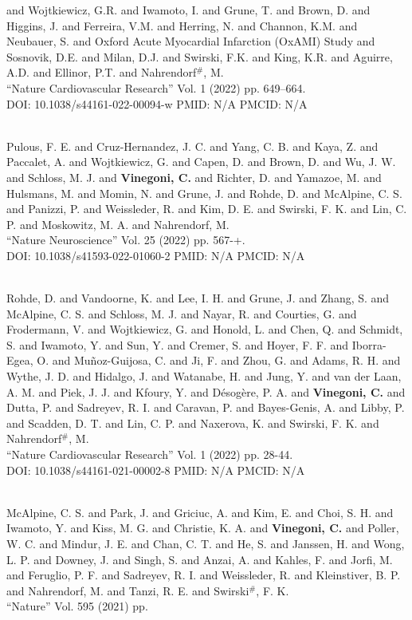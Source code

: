 and Wojtkiewicz, G.R. and Iwamoto, I. and Grune, T. and Brown, D. and Higgins, J. and Ferreira, V.M. and Herring, N. and Channon, K.M. and Neubauer, S. and Oxford Acute Myocardial Infarction (OxAMI) Study and Sosnovik, D.E. and Milan, D.J. and Swirski, F.K. and King, K.R. and Aguirre, A.D. and Ellinor, P.T. and Nahrendorf$^\#$, M. \\ ``Nature Cardiovascular Research'' Vol. 1 (2022) pp. 649–664. \\ DOI: 10.1038/s44161-022-00094-w PMID: N/A PMCID: N/A\item {} \\ Pulous, F. E. and Cruz-Hernandez, J. C. and Yang, C. B. and Kaya, Z. and Paccalet, A. and Wojtkiewicz, G. and Capen, D. and Brown, D. and Wu, J. W. and Schloss, M. J. and {\bf Vinegoni, C.} and Richter, D. and Yamazoe, M. and Hulsmans, M. and Momin, N. and Grune, J. and Rohde, D. and McAlpine, C. S. and Panizzi, P. and Weissleder, R. and Kim, D. E. and Swirski, F. K. and Lin, C. P. and Moskowitz, M. A. and Nahrendorf, M. \\ ``Nature Neuroscience'' Vol. 25 (2022) pp. 567-+. \\ DOI: 10.1038/s41593-022-01060-2 PMID: N/A PMCID: N/A\item {} \\ Rohde, D. and Vandoorne, K. and Lee, I. H. and Grune, J. and Zhang, S. and McAlpine, C. S. and Schloss, M. J. and Nayar, R. and Courties, G. and Frodermann, V. and Wojtkiewicz, G. and Honold, L. and Chen, Q. and Schmidt, S. and Iwamoto, Y. and Sun, Y. and Cremer, S. and Hoyer, F. F. and Iborra-Egea, O. and Muñoz-Guijosa, C. and Ji, F. and Zhou, G. and Adams, R. H. and Wythe, J. D. and Hidalgo, J. and Watanabe, H. and Jung, Y. and van der Laan, A. M. and Piek, J. J. and Kfoury, Y. and Désogère, P. A. and {\bf Vinegoni, C.} and Dutta, P. and Sadreyev, R. I. and Caravan, P. and Bayes-Genis, A. and Libby, P. and Scadden, D. T. and Lin, C. P. and Naxerova, K. and Swirski, F. K. and Nahrendorf$^\#$, M. \\ ``Nature Cardiovascular Research'' Vol. 1 (2022) pp. 28-44. \\ DOI: 10.1038/s44161-021-00002-8 PMID: N/A PMCID: N/A\item {} \\ McAlpine, C. S. and Park, J. and Griciuc, A. and Kim, E. and Choi, S. H. and Iwamoto, Y. and Kiss, M. G. and Christie, K. A. and {\bf Vinegoni, C.} and Poller, W. C. and Mindur, J. E. and Chan, C. T. and He, S. and Janssen, H. and Wong, L. P. and Downey, J. and Singh, S. and Anzai, A. and Kahles, F. and Jorfi, M. and Feruglio, P. F. and Sadreyev, R. I. and Weissleder, R. and Kleinstiver, B. P. and Nahrendorf, M. and Tanzi, R. E. and Swirski$^\#$, F. K. \\ ``Nature'' Vol. 595 (2021) pp. 